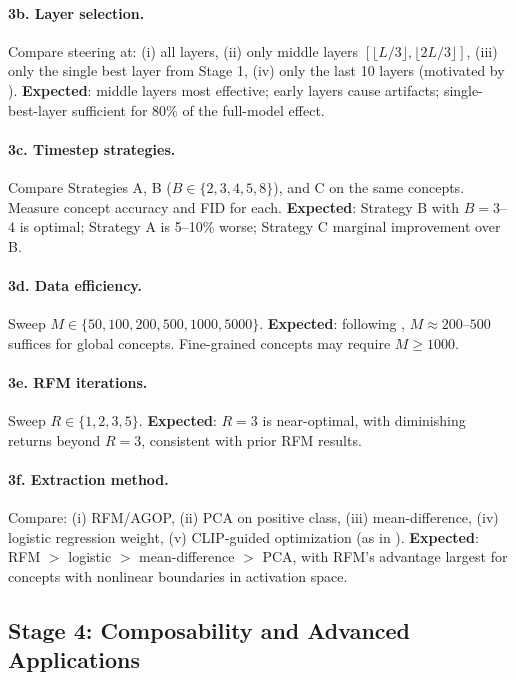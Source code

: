 \documentclass[11pt]{article}
\begin{document}
\paragraph{3b. Layer selection.}
Compare steering at: (i) all layers, (ii) only middle layers $[\lfloor L/3 \rfloor, \lfloor 2L/3 \rfloor]$, (iii) only the single best layer from Stage 1, (iv) only the last 10 layers (motivated by \citet{conceptattention2025}).
\textbf{Expected}: middle layers most effective; early layers cause artifacts; single-best-layer sufficient for 80\% of the full-model effect.

\paragraph{3c. Timestep strategies.}
Compare Strategies A, B ($B \in \{2, 3, 4, 5, 8\}$), and C on the same concepts.
Measure concept accuracy and FID for each.
\textbf{Expected}: Strategy B with $B = 3$--$4$ is optimal; Strategy A is 5--10\% worse; Strategy C marginal improvement over B.

\paragraph{3d. Data efficiency.}
Sweep $M \in \{50, 100, 200, 500, 1000, 5000\}$.
\textbf{Expected}: following \citet{beaglehole2026universal}, $M \approx 200$--$500$ suffices for global concepts.
Fine-grained concepts may require $M \geq 1000$.

\paragraph{3e. RFM iterations.}
Sweep $R \in \{1, 2, 3, 5\}$.
\textbf{Expected}: $R = 3$ is near-optimal, with diminishing returns beyond $R = 3$, consistent with prior RFM results.

\paragraph{3f. Extraction method.}
Compare: (i) RFM/AGOP, (ii) PCA on positive class, (iii) mean-difference, (iv) logistic regression weight, (v) CLIP-guided optimization (as in \citet{kwon2023diffusion}).
\textbf{Expected}: RFM $>$ logistic $>$ mean-difference $>$ PCA, with RFM's advantage largest for concepts with nonlinear boundaries in activation space.

\subsection{Stage 4: Composability and Advanced Applications}
\label{sec:exp_stage4}
\end{document}
